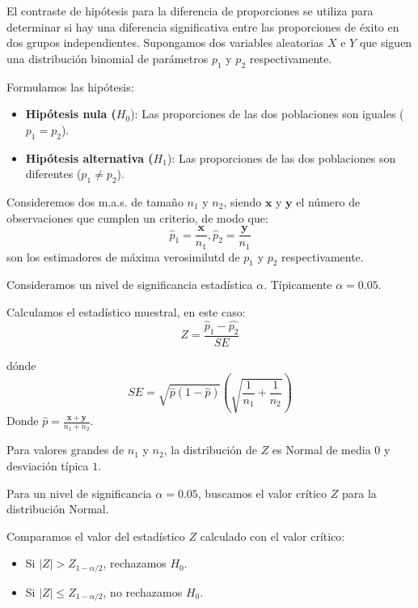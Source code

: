 \documentclass[
  letterpaper,
  DIV=11,
  numbers=noendperiod]{scrreprt}
\providecommand{\tightlist}{%
  \setlength{\itemsep}{0pt}\setlength{\parskip}{0pt}}\usepackage{longtable,booktabs,array}
\begin{document}
El contraste de hipótesis para la diferencia de proporciones se utiliza
para determinar si hay una diferencia significativa entre las
proporciones de éxito en dos grupos independientes. Supongamos dos
variables aleatorias \(X\) e \(Y\) que siguen una distribución binomial
de parámetros \(p_1\) y \(p_2\) respectivamente.

Formulamos las hipótesis:

\begin{itemize}
\tightlist
\item
  \textbf{Hipótesis nula (}\(H_0\)): Las proporciones de las dos
  poblaciones son iguales (\(p_1=p_2\)).
\item
  \textbf{Hipótesis alternativa (}\(H_1\)): Las proporciones de las dos
  poblaciones son diferentes (\(p_1 \neq p_2\)).
\end{itemize}

Consideremos dos m.a.s. de tamaño \(n_1\) y \(n_2\), siendo
\(\mathbf{x}\) y \(\mathbf{y}\) el número de observaciones que cumplen
un criterio, de modo que: \[
\hat{p}_1=\frac{\mathbf{x}}{n_1}, \hat{p}_2=\frac{\mathbf{y}}{n_1}
\] son los estimadores de máxima verosimilutd de \(p_1\) y \(p_2\)
respectivamente.

Consideramos un nivel de significancia estadística \(\alpha\).
Típicamente \(\alpha=0.05\).

Calculamos el estadístico muestral, en este caso: \[
Z = \frac{\hat{p}_1-\hat{p_2}}{SE}
\]

dónde \[
SE=\sqrt{\hat{p}(1-\hat{p})}\left ( \sqrt{\frac{1}{n_1}+\frac{1}{n_2}}\right )
\] Donde \(\hat{p}=\frac{\mathbf{x}+\mathbf{y}}{n_1+n_2}\).

Para valores grandes de \(n_1\) y \(n_2\), la distribución de \(Z\) es
Normal de media \(0\) y desviación típica \(1\).

Para un nivel de significancia \(\alpha= 0.05\), buscamos el valor
crítico \(Z\) para la distribución Normal.

Comparamos el valor del estadístico \(Z\) calculado con el valor
crítico:

\begin{itemize}
\tightlist
\item
  Si \(|Z| > Z_{1-\alpha/2}\), rechazamos \(H_0\).
\item
  Si \(|Z| \leq Z_{1-\alpha/2}\), no rechazamos \(H_0\).
\end{itemize}
\end{document}
